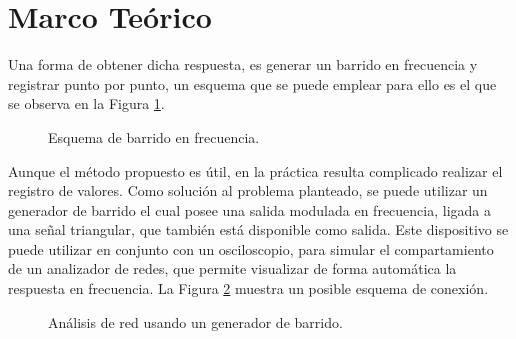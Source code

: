   \section{Marco Teórico}

    Una forma de obtener dicha respuesta, es generar un barrido en frecuencia 
    y registrar punto por punto, un esquema que se puede emplear para ello es el que 
    se observa en la Figura \ref{fig:GenBarrido}.
      \begin{figure}[H]
        \centering
          \caption{Esquema de barrido en frecuencia.}
          \label{fig:GenBarrido}
      \end{figure}

    Aunque el método propuesto es útil, en la práctica resulta complicado realizar el 
    registro de valores. Como solución al problema planteado, se puede utilizar un generador 
    de barrido el cual posee una salida modulada en frecuencia, ligada a una señal triangular,   
    que también está disponible como salida. Este dispositivo se puede utilizar en conjunto 
    con un osciloscopio, para simular el compartamiento de un analizador de redes, que 
    permite visualizar de forma automática la respuesta en frecuencia. 
    La Figura \ref{fig:GenBarridoRed} muestra un posible esquema de conexión. 

      \begin{figure}[H]
        \centering
          \caption{Análisis de red usando un generador de barrido.}
          \label{fig:GenBarridoRed}
      \end{figure}
    

